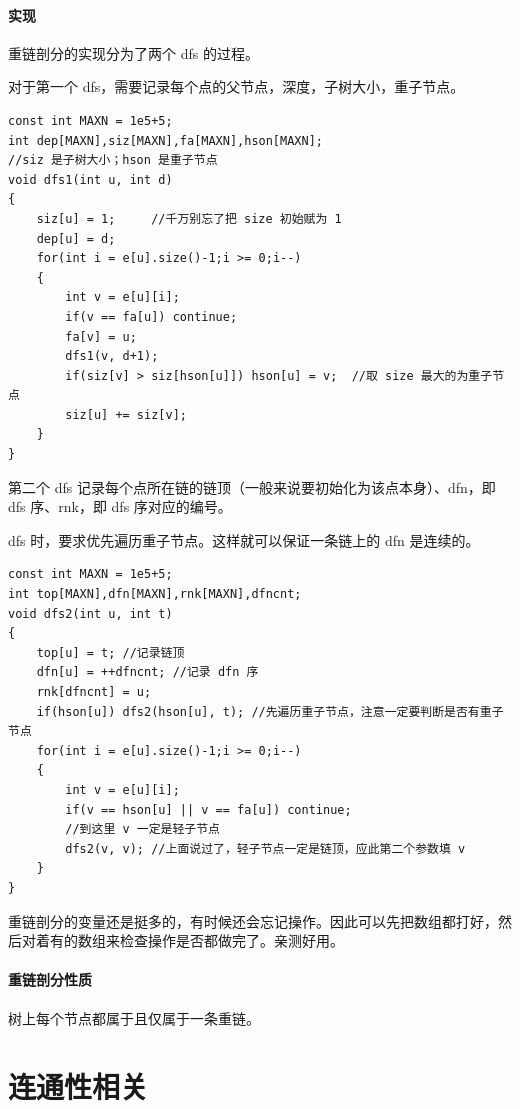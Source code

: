 \documentclass[10pt,twoside,a4paper,UTF8]{ctexbook}
\begin{document}
	\subsubsection{实现}
	重链剖分的实现分为了两个 dfs 的过程。\par
	对于第一个 dfs，需要记录每个点的父节点，深度，子树大小，重子节点。
	\begin{lstlisting}
const int MAXN = 1e5+5;
int dep[MAXN],siz[MAXN],fa[MAXN],hson[MAXN];
//siz 是子树大小；hson 是重子节点
void dfs1(int u, int d)
{
	siz[u] = 1;		//千万别忘了把 size 初始赋为 1
	dep[u] = d;
	for(int i = e[u].size()-1;i >= 0;i--)
	{
		int v = e[u][i];
		if(v == fa[u]) continue;
		fa[v] = u;
		dfs1(v, d+1);
		if(siz[v] > siz[hson[u]]) hson[u] = v;	//取 size 最大的为重子节点
		siz[u] += siz[v];
	}
}
	\end{lstlisting}\par
	第二个 dfs 记录每个点所在链的链顶（一般来说要初始化为该点本身）、dfn，即 dfs 序、rnk，即 dfs 序对应的编号。\par
	dfs 时，要求优先遍历重子节点。这样就可以保证一条链上的 dfn 是连续的。
	\begin{lstlisting}
const int MAXN = 1e5+5;
int top[MAXN],dfn[MAXN],rnk[MAXN],dfncnt;
void dfs2(int u, int t)
{
	top[u] = t; //记录链顶
	dfn[u] = ++dfncnt; //记录 dfn 序
	rnk[dfncnt] = u;
	if(hson[u]) dfs2(hson[u], t); //先遍历重子节点，注意一定要判断是否有重子节点
	for(int i = e[u].size()-1;i >= 0;i--)
	{
		int v = e[u][i];
		if(v == hson[u] || v == fa[u]) continue;
		//到这里 v 一定是轻子节点
		dfs2(v, v); //上面说过了，轻子节点一定是链顶，应此第二个参数填 v
	}
}
	\end{lstlisting}\par
	重链剖分的变量还是挺多的，有时候还会忘记操作。因此可以先把数组都打好，然后对着有的数组来检查操作是否都做完了。亲测好用。
	\subsubsection{重链剖分性质}
	树上每个节点都属于且仅属于一条重链。\par
	
	
	
	\chapter{连通性相关}
\end{document}
